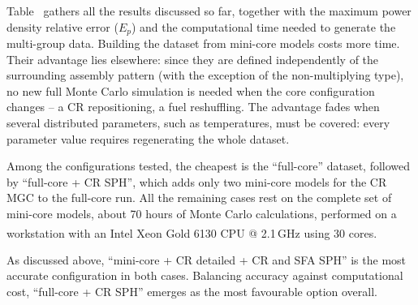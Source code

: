 Table~ gathers all the results discussed so far, together with the maximum power density relative error ($E_p$) and the computational time needed to generate the multi-group data. Building the dataset from mini-core models costs more time. Their advantage lies elsewhere: since they are defined independently of the surrounding assembly pattern (with the exception of the non-multiplying type), no new full Monte Carlo simulation is needed when the core configuration changes -- a CR repositioning, a fuel reshuffling. The advantage fades when several distributed parameters, such as temperatures, must be covered: every parameter value requires regenerating the whole dataset.

Among the configurations tested, the cheapest is the ``full-core'' dataset, followed by ``full-core + CR SPH'', which adds only two mini-core models for the CR MGC to the full-core run. All the remaining cases rest on the complete set of mini-core models, about 70 hours of Monte Carlo calculations, performed on a workstation with an Intel\textsuperscript{\textregistered} Xeon\textsuperscript{\textregistered} Gold 6130 CPU @ 2.1\,GHz using 30 cores.

As discussed above, ``mini-core + CR detailed + CR and SFA SPH'' is the most accurate configuration in both cases. Balancing accuracy against computational cost, ``full-core + CR SPH'' emerges as the most favourable option overall.




